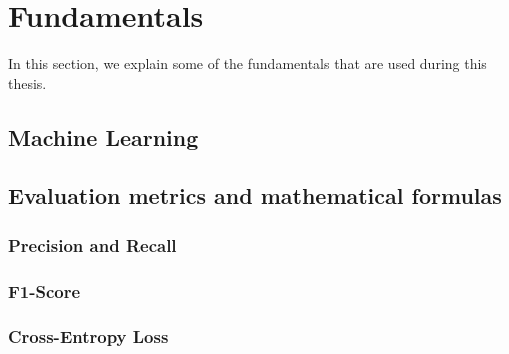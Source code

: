 \section{Fundamentals}

In this section, we explain some of the fundamentals that are used during this thesis. 

\subsection{Machine Learning}

\subsection{Evaluation metrics and mathematical formulas}

\subsubsection{Precision and Recall}

\subsubsection{F1-Score}

\subsubsection{Cross-Entropy Loss}